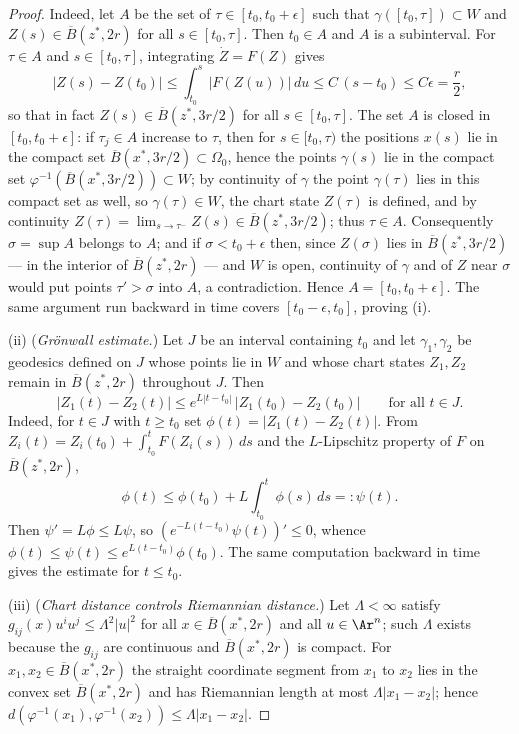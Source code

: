 \begin{proof}
Indeed, let $A$ be the set of $\tau\in[t_0,t_0+\epsilon]$ such that
$\gamma([t_0,\tau])\subset W$ and $Z(s)\in\overline{B}(z^*,2r)$ for
all $s\in[t_0,\tau]$. Then $t_0\in A$ and $A$ is a subinterval. For
$\tau\in A$ and $s\in[t_0,\tau]$, integrating $\dot Z=F(Z)$ gives
$$|Z(s)-Z(t_0)|\le\int_{t_0}^{s}|F(Z(u))|\,du\le C\,(s-t_0)\le
C\epsilon=\frac{r}{2},$$
so that in fact $Z(s)\in\overline{B}(z^*,3r/2)$ for all
$s\in[t_0,\tau]$. The set $A$ is closed in $[t_0,t_0+\epsilon]$: if
$\tau_j\in A$ increase to $\tau$, then for $s\in[t_0,\tau)$ the
positions $x(s)$ lie in the compact set
$\overline{B}(x^*,3r/2)\subset\Omega_0$, hence the points $\gamma(s)$
lie in the compact set
$\varphi^{-1}(\overline{B}(x^*,3r/2))\subset W$; by continuity of
$\gamma$ the point $\gamma(\tau)$ lies in this compact set as well,
so $\gamma(\tau)\in W$, the chart state $Z(\tau)$ is defined, and by
continuity $Z(\tau)=\lim_{s\rightarrow\tau^-}Z(s)\in
\overline{B}(z^*,3r/2)$; thus $\tau\in A$. Consequently
$\sigma=\sup A$ belongs to $A$; and if $\sigma<t_0+\epsilon$ then,
since $Z(\sigma)$ lies in $\overline{B}(z^*,3r/2)$ --- in the
interior of $\overline{B}(z^*,2r)$ --- and $W$ is open, continuity of
$\gamma$ and of $Z$ near $\sigma$ would put points $\tau'>\sigma$
into $A$, a contradiction. Hence $A=[t_0,t_0+\epsilon]$. The same
argument run backward in time covers $[t_0-\epsilon,t_0]$, proving
(i).

(ii) ({\em Gr\"onwall estimate.}) Let $J$ be an interval containing
$t_0$ and let $\gamma_1,\gamma_2$ be geodesics defined on $J$ whose
points lie in $W$ and whose chart states $Z_1,Z_2$ remain in
$\overline{B}(z^*,2r)$ throughout $J$. Then
$$|Z_1(t)-Z_2(t)|\le e^{L|t-t_0|}\,|Z_1(t_0)-Z_2(t_0)|
\qquad\text{for all } t\in J.$$
Indeed, for $t\in J$ with $t\ge t_0$ set $\phi(t)=|Z_1(t)-Z_2(t)|$.
From $Z_i(t)=Z_i(t_0)+\int_{t_0}^tF(Z_i(s))\,ds$ and the
$L$-Lipschitz property of $F$ on $\overline{B}(z^*,2r)$,
$$\phi(t)\le\phi(t_0)+L\int_{t_0}^t\phi(s)\,ds=:\psi(t).$$
Then $\psi'=L\phi\le L\psi$, so
$\left(e^{-L(t-t_0)}\psi(t)\right)'\le0$, whence
$\phi(t)\le\psi(t)\le e^{L(t-t_0)}\phi(t_0)$. The same computation
backward in time gives the estimate for $t\le t_0$.

(iii) ({\em Chart distance controls Riemannian distance.}) Let
$\Lambda<\infty$ satisfy $g_{ij}(x)u^iu^j\le\Lambda^2|u|^2$ for all
$x\in\overline{B}(x^*,2r)$ and all $u\in\Ar^n$; such $\Lambda$ exists
because the $g_{ij}$ are continuous and $\overline{B}(x^*,2r)$ is
compact. For $x_1,x_2\in\overline{B}(x^*,2r)$ the straight coordinate
segment from $x_1$ to $x_2$ lies in the convex set
$\overline{B}(x^*,2r)$ and has Riemannian length at most
$\Lambda|x_1-x_2|$; hence
$d\left(\varphi^{-1}(x_1),\varphi^{-1}(x_2)\right)\le
\Lambda|x_1-x_2|$.


\end{proof}
